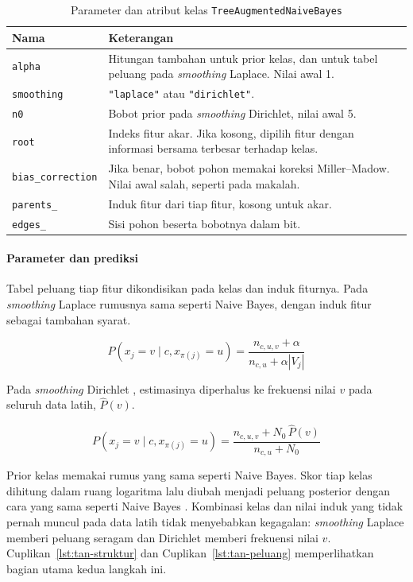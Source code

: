 \begin{table}[H]
    \centering
    \small
    \renewcommand{\arraystretch}{1.2}
    \begin{tabularx}{\textwidth}{@{}lX@{}}
        \toprule
        \textbf{Nama} & \textbf{Keterangan} \\
        \midrule
        \texttt{alpha} & Hitungan tambahan untuk prior kelas, dan untuk tabel peluang pada \textit{smoothing} Laplace. Nilai awal 1. \\
        \texttt{smoothing} & \texttt{"laplace"} atau \texttt{"dirichlet"}. \\
        \texttt{n0} & Bobot prior pada \textit{smoothing} Dirichlet, nilai awal 5. \\
        \texttt{root} & Indeks fitur akar. Jika kosong, dipilih fitur dengan informasi bersama terbesar terhadap kelas. \\
        \texttt{bias\_correction} & Jika benar, bobot pohon memakai koreksi Miller--Madow. Nilai awal salah, seperti pada makalah. \\
        \texttt{parents\_} & Induk fitur dari tiap fitur, kosong untuk akar. \\
        \texttt{edges\_} & Sisi pohon beserta bobotnya dalam bit. \\
        \bottomrule
    \end{tabularx}
    \caption{Parameter dan atribut kelas \texttt{TreeAugmentedNaiveBayes}}
    \label{tab:tan-atribut}
\end{table}

\paragraph{Parameter dan prediksi}
Tabel peluang tiap fitur dikondisikan pada kelas dan induk fiturnya. Pada \textit{smoothing} Laplace rumusnya sama seperti Naive Bayes, dengan induk fitur sebagai tambahan syarat.

\[
P(x_j=v\mid c,x_{\pi(j)}=u)=
\frac{n_{c,u,v}+\alpha}{n_{c,u}+\alpha|V_j|}
\]

Pada \textit{smoothing} Dirichlet \cite{ref:friedman-1997}, estimasinya diperhalus ke frekuensi nilai $v$ pada seluruh data latih, $\hat P(v)$.

\[
P(x_j=v\mid c,x_{\pi(j)}=u)=
\frac{n_{c,u,v}+N_0\,\hat P(v)}{n_{c,u}+N_0}
\]

Prior kelas memakai rumus yang sama seperti Naive Bayes. Skor tiap kelas dihitung dalam ruang logaritma lalu diubah menjadi peluang posterior dengan cara yang sama seperti Naive Bayes \cite{ref:blanchard-2021}. Kombinasi kelas dan nilai induk yang tidak pernah muncul pada data latih tidak menyebabkan kegagalan: \textit{smoothing} Laplace memberi peluang seragam dan Dirichlet memberi frekuensi nilai $v$. Cuplikan~\ref{lst:tan-struktur} dan Cuplikan~\ref{lst:tan-peluang} memperlihatkan bagian utama kedua langkah ini.

